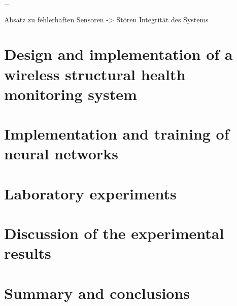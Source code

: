 \documentclass[12pt]{article}
\begin{document}
...

Absatz zu fehlerhaften Sensoren -> Stören Integrität des Systems


\section*{Design and implementation of a wireless structural health monitoring system}


\section*{Implementation and training of neural networks}



\section*{Laboratory experiments}

\section*{Discussion of the experimental results}

\section*{Summary and conclusions}



\end{document}
